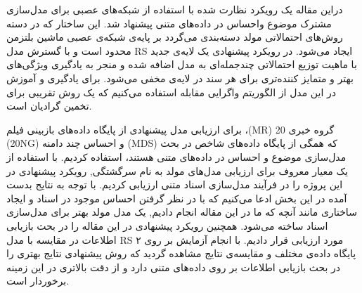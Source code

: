 \documentclass[12pt,a4paper]{article}
\begin{document}
 دراین مقاله یک رویکرد نظارت شده با استفاده از شبکه‌های عصبی برای مدل‌سازی مشترک موضوع واحساس در داده‌های متنی پیشنهاد شد. این ساختار که در دسته روش‌های احتمالاتی مولد دسته‌بندی می‌گردد بر پایه‌ی شبکه‌ی عصبی ماشین بلتزمن محدود است و با گسترش مدل RS ایجاد می‌شود. در رویکرد پیشنهادی یک لایه‌ی جدید با ماهیت توزیع احتمالاتی چندجمله‌ای به مدل اضافه شده و منجر به یادگیری ویژگی‌های بهتر و متمایز کننده‌تری برای هر سند در لایه‌ی مخفی می‌شود. برای یادگیری و آموزش در این مدل از الگوریتم واگرایی مقابله استفاده می‌کنیم که یک روش تقریبی برای تخمین گرادیان است.

برای ارزیابی مدل پیشنهادی از پایگاه داده‌های بازبینی فیلم
،(MR)
20 گروه خبری 
(20NG)
و احساس چند دامنه 
(MDS)
که همگی از پایگاه داده‌های شاخص در بحث مدل‌سازی موضوع و احساس  در داده‌های متنی هستند، استفاده کردیم. با استفاده از یک معيار معروف برای ارزیابی مدل‌های مولد به نام سرگشتگی, رویکرد پیشنهادی در این پروژه را در فرآیند مدل‌سازی اسناد متنی ارزیابی کردیم. با توجه به نتایج بدست آمده در این بخش ادعا می‌کنیم که با در نظر گرفتن احساس موجود در اسناد و ایجاد ساختاری مانند آنچه که ما در این مقاله انجام دادیم, یک مدل مولد بهتر برای مدل‌سازی اسناد ساخته می‌شود.  همچنین رویکرد پیشنهادی در این مقاله را در بحث بازیابی اطلاعات در مقایسه با مدل RS مورد ارزیابی قرار دادیم. با انجام آزمایش بر روی ۲ پایگاه داده‌‌ی مختلف و مقایسه‌ی نتایج مشاهده گردید که روش پیشنهادی نتایج بهتری را در بحث بازیابی اطلاعات بر روی داده‌های متنی دارد و از دقت بالاتری در این زمینه برخوردار است.

%
%
\end{document}
